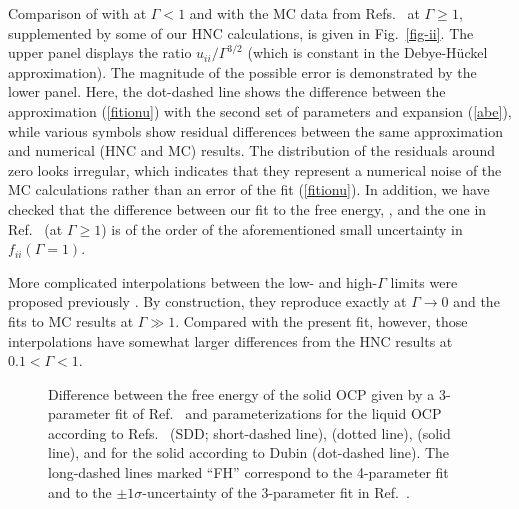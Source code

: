 Comparison of  with 
at $\Gamma<1$ and with the MC data from Refs.~\cite{DWS,Caillol}
at $\Gamma\geq1$, supplemented by some of our HNC calculations, 
is given in Fig.~\ref{fig-ii}.
The upper panel displays the ratio $u_{ii}/\Gamma^{3/2}$
(which is constant in the Debye-H\"uckel approximation).
The magnitude of the possible error is demonstrated by
the lower panel. Here, 
the dot-dashed line shows the difference between 
the approximation (\ref{fitionu}) 
with the second set of parameters
and expansion (\ref{abe}), while
various symbols show residual differences between 
the same approximation and numerical 
(HNC and MC) results.
The distribution of the residuals around zero
looks irregular, which indicates that they represent
 a numerical noise of the MC calculations rather than
 an error of the fit (\ref{fitionu}).
In addition, we have checked that the difference between our fit to 
the free energy, ,
and the one in Ref.\ \cite{DWS} (at $\Gamma\geq1$) is of the order of
the aforementioned small uncertainty in
$f_{ii}(\Gamma=1)$.

More complicated interpolations between the low- and high-$\Gamma$ 
limits were proposed previously \cite{Kahlbaum,SB99}. 
By construction,
they reproduce exactly  at $\Gamma\to0$
and the fits to MC results at $\Gamma\gg1$. 
Compared with the present fit, however, those interpolations
have somewhat larger differences 
from the HNC results at $0.1<\Gamma<1$.


\begin{figure}
    \begin{center}
    \leavevmode
    \epsfxsize=86mm
    \end{center}
\caption{ 
Difference between the free energy of the solid OCP given
by a 3-parameter fit of Ref.\ \protect\cite{FH} and parameterizations
for the liquid OCP according to Refs.\ \protect\cite{SDD}
(SDD; short-dashed line), 
\protect\cite{DWS} (dotted line), \protect{} (solid line),
and for the solid according to Dubin
\protect\cite{Dubin} (dot-dashed line).
The long-dashed
lines marked ``FH'' correspond to the 
4-parameter fit and to the $\pm1\sigma$-uncertainty
of the 3-parameter fit in Ref.~\protect\cite{FH}.
}
\label{fig-fliqsol}
\end{figure}



